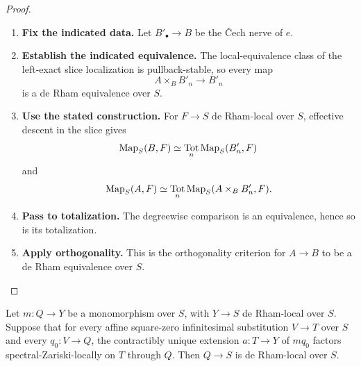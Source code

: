 \begin{proof}
\leavevmode
\begin{enumerate}[label=\textup{(\arabic*)}]
    \item \textbf{Fix the indicated data.}
    Let \(B'_\bullet\to B\) be the \v{C}ech nerve of \(e\).
    \item \textbf{Establish the indicated equivalence.}
    The local-equivalence
    class of the left-exact slice localization is pullback-stable, so every map
    \[
    A\times_BB'_n\longrightarrow B'_n
    \]
    is a de Rham equivalence over \(S\).
    \item \textbf{Use the stated construction.}
    For \(F\to S\) de Rham-local over \(S\),
    effective descent in the slice gives
    \[
    \operatorname{Map}_S(B,F)
    \simeq
    \operatorname*{Tot}_n\operatorname{Map}_S(B'_n,F)
    \]
    and
    \[
    \operatorname{Map}_S(A,F)
    \simeq
    \operatorname*{Tot}_n\operatorname{Map}_S(A\times_BB'_n,F).
    \]
    \item \textbf{Pass to totalization.}
    The degreewise comparison is an equivalence, hence so is its totalization.
    \item \textbf{Apply orthogonality.}
    This is
    the orthogonality criterion for \(A\to B\) to be a de Rham equivalence over \(S\).
\end{enumerate}
\end{proof}

\begin{lemma}
\label{lem:relative-image-locality}
Let \(m:Q\to Y\) be a monomorphism over \(S\), with \(Y\to S\) de Rham-local
over \(S\). Suppose that for every affine square-zero infinitesimal substitution \(V\to T\) over
\(S\) and every \(q_0:V\to Q\), the contractibly unique extension
\(a:T\to Y\) of \(mq_0\) factors spectral-Zariski-locally on \(T\) through
\(Q\). Then \(Q\to S\) is de Rham-local over \(S\).
\end{lemma}

